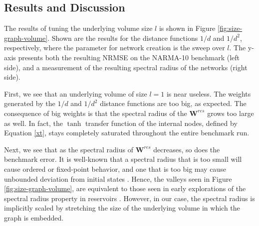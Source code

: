 \subsection{Results and Discussion}

The results of tuning the underlying volume size $l$ is shown in Figure
\ref{fig:size-graph-volume}. Shown are the results for the distance functions
$1/d$ and $1/d^2$, respectively, where the parameter for network creation is the
sweep over $l$. The y-axis presents both the resulting NRMSE on the NARMA-10
benchmark (left side), and a measurement of the resulting spectral radius of the
networks (right side).

First, we see that an underlying volume of size $l = 1$ is near useless. The
weights generated by the $1/d$ and $1/d^2$ distance functions are too big, as
expected. The consequence of big weights is that the spectral radius of the
$\mathbf{W}^{res}$ grows too large as well. In fact, the $\tanh$ transfer
function of the internal nodes, defined by Equation \ref{xt}, stays completely
saturated throughout the entire benchmark run.

Next, we see that as the spectral radius of $\mathbf{W}^{res}$ decreases, so
does the benchmark error. It is well-known that a spectral radius that is too
small will cause ordered or fixed-point behavior, and one that is too big may
cause unbounded deviation from initial states
\cite{alippi_quantification_2009}. Hence, the valleys seen in Figure
\ref{fig:size-graph-volume}, are equivalent to those seen in early explorations
of the spectral radius property in reservoirs
\cite{verstraeten_experimental_2007}. However, in our case, the spectral radius
is implicitly scaled by stretching the size of the underlying volume in which
the graph is embedded.

